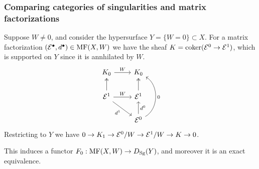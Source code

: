 
\subsubsection{Comparing categories of singularities and matrix factorizations}

Suppose $W\ne0$, and consider the hypersurface $Y=\{W=0\}\subset X$. For a
matrix factorization $(\mathcal{E}^\bullet,d^\bullet)\in\mathrm{MF}(X,W)$ we have the sheaf
$K=\operatorname{coker}(\mathcal{E}^0\to\mathcal{E}^1)$, which is supported on $Y$ since it is annhilated
by $W$.
\begin{equation*}
    \begin{tikzcd}
        K_0 \ar[r,"W"] & K_0 \\
        \calE^1 \ar[r,"W"] \ar[dr,"d^1"'] \ar[u,two heads] &
        \calE^1 \ar[u,two heads] \\
        & \calE^0 \ar[u,"d^0"'] \ar[uu,bend right=60,"0"']
    \end{tikzcd}
\end{equation*}
Restricting to $Y$ we have $0\to K_1\to\mathcal{E}^0/W\to\mathcal{E}^1/W\to K\to0$.

\begin{proposition}{}{}
    This induces a functor $F_0:\mathrm{MF}(X,W)\to D_{\mathrm{Sg}}(Y)$, and moreover it is an
    exact equivalence.
\end{proposition}

